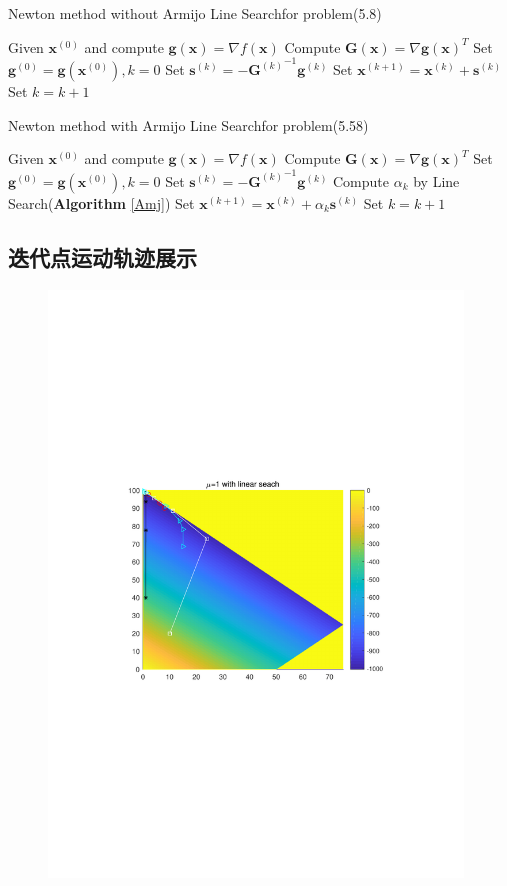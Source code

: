\begin{algorithm}[h]  
\caption{Newton method without Armijo Line Searchfor problem(5.8)}  
\begin{algorithmic}[1]  
\STATE Given $\bm{x}^{(0)}$ and compute $\bm{g}(\bm{x})= \nabla f(\bm{x})$
\STATE Compute $\bm{G}(\bm{x})= \nabla {\bm{g}(\bm{x})}^T$
\STATE Set $\bm{g}^{(0)}=\bm{g}(\bm{x}^{(0)}),k=0$
\STATE Set $\bm{s}^{(k)}=-{\bm{G}^{(k)}}^{-1}\bm{g}^{(k)}$
\STATE Set $\bm{x}^{(k+1)}=\bm{x}^{(k)}+\bm{s}^{(k)}$
\STATE Set $k=k+1$
\ENDWHILE
\end{algorithmic}  
\end{algorithm} 

\begin{algorithm}[h]  
\caption{Newton method with Armijo Line Searchfor problem(5.58)}  
\label{NewtonAmj} 
\begin{algorithmic}[1]  
\STATE Given $\bm{x}^{(0)}$ and compute $\bm{g}(\bm{x})= \nabla f(\bm{x})$
\STATE Compute $\bm{G}(\bm{x})= \nabla {\bm{g}(\bm{x})}^T$
\STATE Set $\bm{g}^{(0)}=\bm{g}(\bm{x}^{(0)}),k=0$
\STATE Set $\bm{s}^{(k)}=-{\bm{G}^{(k)}}^{-1}\bm{g}^{(k)}$
\STATE Compute $\alpha_k$ by Line Search(\textbf{Algorithm} \ref{Amj})
\STATE Set $\bm{x}^{(k+1)}=\bm{x}^{(k)}+\alpha_k\bm{s}^{(k)}$
\STATE Set $k=k+1$
\ENDWHILE
\end{algorithmic}  
\end{algorithm} 



\subsection{迭代点运动轨迹展示}
\begin{figure}[H]
\centering
\includegraphics[width=11cm]{fig/3_1.pdf}
\end{figure}

